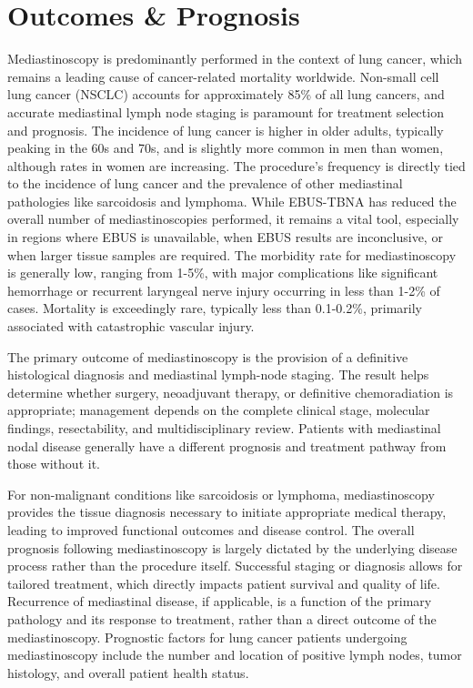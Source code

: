 \section*{Outcomes \& Prognosis}
Mediastinoscopy is predominantly performed in the context of lung cancer, which remains a leading cause of cancer-related mortality worldwide. Non-small cell lung cancer (NSCLC) accounts for approximately 85\% of all lung cancers, and accurate mediastinal lymph node staging is paramount for treatment selection and prognosis. The incidence of lung cancer is higher in older adults, typically peaking in the 60s and 70s, and is slightly more common in men than women, although rates in women are increasing. The procedure's frequency is directly tied to the incidence of lung cancer and the prevalence of other mediastinal pathologies like sarcoidosis and lymphoma. While EBUS-TBNA has reduced the overall number of mediastinoscopies performed, it remains a vital tool, especially in regions where EBUS is unavailable, when EBUS results are inconclusive, or when larger tissue samples are required. The morbidity rate for mediastinoscopy is generally low, ranging from 1-5\%, with major complications like significant hemorrhage or recurrent laryngeal nerve injury occurring in less than 1-2\% of cases. Mortality is exceedingly rare, typically less than 0.1-0.2\%, primarily associated with catastrophic vascular injury.

The primary outcome of mediastinoscopy is the provision of a definitive histological diagnosis and mediastinal lymph-node staging. The result helps determine whether surgery, neoadjuvant therapy, or definitive chemoradiation is appropriate; management depends on the complete clinical stage, molecular findings, resectability, and multidisciplinary review. Patients with mediastinal nodal disease generally have a different prognosis and treatment pathway from those without it.

For non-malignant conditions like sarcoidosis or lymphoma, mediastinoscopy provides the tissue diagnosis necessary to initiate appropriate medical therapy, leading to improved functional outcomes and disease control. The overall prognosis following mediastinoscopy is largely dictated by the underlying disease process rather than the procedure itself. Successful staging or diagnosis allows for tailored treatment, which directly impacts patient survival and quality of life. Recurrence of mediastinal disease, if applicable, is a function of the primary pathology and its response to treatment, rather than a direct outcome of the mediastinoscopy. Prognostic factors for lung cancer patients undergoing mediastinoscopy include the number and location of positive lymph nodes, tumor histology, and overall patient health status.

